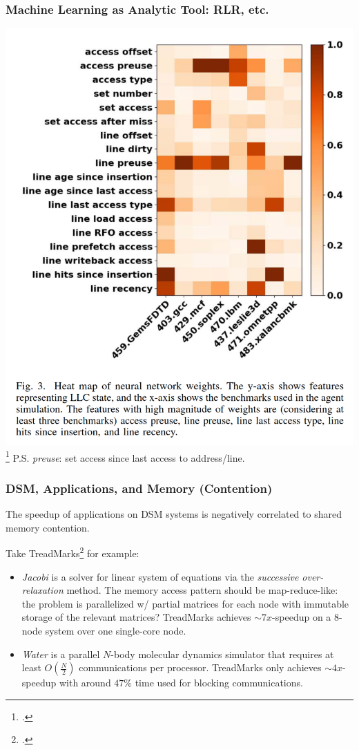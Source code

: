 \documentclass{beamer}
\begin{document}
\begin{frame}
    \frametitle{Machine Learning as Analytic Tool: RLR, etc.}
    \includegraphics[height=0.6\textheight, center]{w4_slices_resources/RLR.Fig3.png}
    \footcite{SYS.2021.RLR}
    P.S. \textit{preuse}: set access since last access to address/line.
\end{frame}

\begin{frame}
    \frametitle{DSM, Applications, and Memory (Contention)}
    The speedup of applications on DSM systems is negatively correlated to shared memory contention.

    Take TreadMarks\footcite{CDKP.1994.TreadMarks} for example:
    \begin{itemize}
        \item \textit{Jacobi} is a solver for linear system of equations via the \textit{successive over-relaxation} method.
               The memory access pattern should be map-reduce-like: the problem is parallelized w/ partial matrices for each node with immutable storage of the relevant matrices?
               TreadMarks achieves $\sim7x$-speedup on a 8-node system over one single-core node.
        \item \textit{Water} is a parallel $N$-body molecular dynamics simulator that requires at least $O(\frac{N}{2})$ communications per processor.
               TreadMarks only achieves $\sim4x$-speedup with around $47\%$ time used for blocking communications.
    \end{itemize}
\end{frame}
\end{document}
